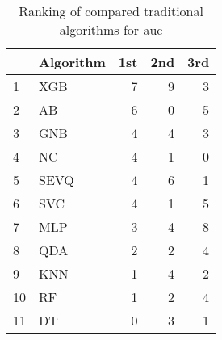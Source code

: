 \begin{table}[H]
\footnotesize
\centering
\caption{Ranking of compared traditional algorithms for auc}
\label{tab:Traditional places auc}
\begin{tabular}{llrrr}
\hline
{} & Algorithm &  1st &  2nd &  3rd \\
\hline
1  &       XGB &    7 &    9 &    3 \\
2  &        AB &    6 &    0 &    5 \\
3  &       GNB &    4 &    4 &    3 \\
4  &        NC &    4 &    1 &    0 \\
5  &      SEVQ &    4 &    6 &    1 \\
6  &       SVC &    4 &    1 &    5 \\
7  &       MLP &    3 &    4 &    8 \\
8  &       QDA &    2 &    2 &    4 \\
9  &       KNN &    1 &    4 &    2 \\
10 &        RF &    1 &    2 &    4 \\
11 &        DT &    0 &    3 &    1 \\
\hline
\end{tabular}
\end{table}
